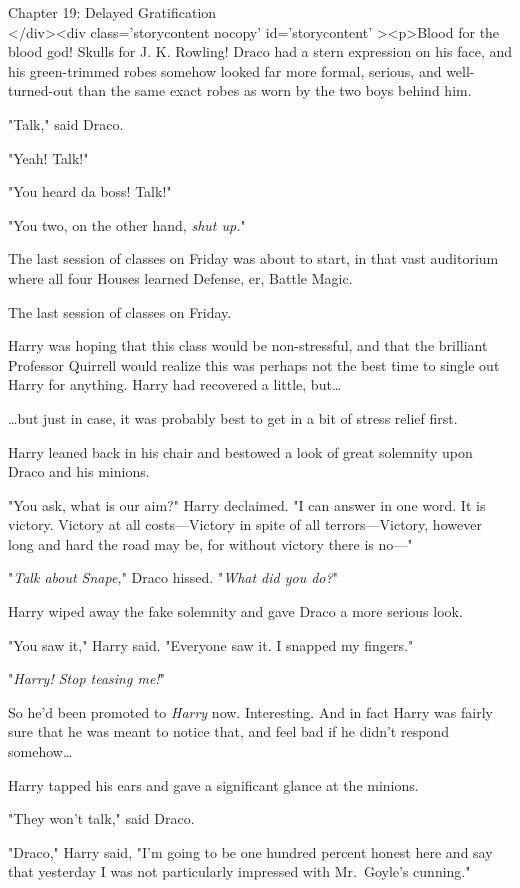 
Chapter 19: Delayed Gratification\\
</div><div  class='storycontent nocopy' id='storycontent' ><p>Blood for the blood god! Skulls for J. K. Rowling!
\sbreak
Draco had a stern expression on his face, and his green-trimmed robes somehow looked far more formal, serious, and well-turned-out than the same exact robes as worn by the two boys behind him.

"Talk," said Draco.

"Yeah! Talk!"

"You heard da boss! Talk!"

"You two, on the other hand, \emph{shut up.}"

The last session of classes on Friday was about to start, in that vast auditorium where all four Houses learned Defense, er, Battle Magic.

The last session of classes on Friday.

Harry was hoping that this class would be non-stressful, and that the brilliant Professor Quirrell would realize this was perhaps not the best time to single out Harry for anything. Harry had recovered a little, but{\ldots}

{\ldots}but just in case, it was probably best to get in a bit of stress relief first.

Harry leaned back in his chair and bestowed a look of great solemnity upon Draco and his minions.

"You ask, what is our aim?" Harry declaimed. "I can answer in one word. It is victory. Victory at all costs---Victory in spite of all terrors---Victory, however long and hard the road may be, for without victory there is no---"

"\emph{Talk about Snape,}" Draco hissed. "\emph{What did you do?}"

Harry wiped away the fake solemnity and gave Draco a more serious look.

"You saw it," Harry said. "Everyone saw it. I snapped my fingers."

"\emph{Harry! Stop teasing me!}"

So he'd been promoted to \emph{Harry} now. Interesting. And in fact Harry was fairly sure that he was meant to notice that, and feel bad if he didn't respond somehow{\ldots}

Harry tapped his ears and gave a significant glance at the minions.

"They won't talk," said Draco.

"Draco," Harry said, "I'm going to be one hundred percent honest here and say that yesterday I was not particularly impressed with Mr.~Goyle's cunning."

